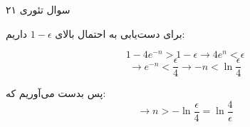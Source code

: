 سوال تئوری ۲۱

برای دست‌یابی به احتمال بالای
$1 - \epsilon$
داریم:

$$
1 - 4e^{-n} > 1 - \epsilon \to 4e^{n} < \epsilon
$$
$$
\to e^{-n} < \frac {\epsilon} {4} \to -n < \ln{\frac {\epsilon} {4}}
$$

پس بدست می‌آوریم که:
$$
\to n > -\ln{\frac {\epsilon} {4}} = \ln{\frac {4} {\epsilon}}
$$